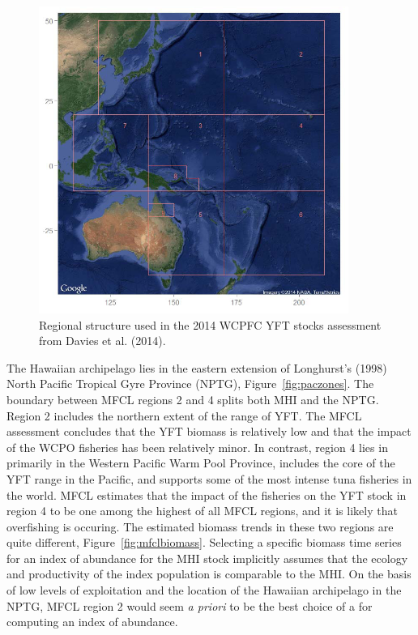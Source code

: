 \documentclass[12pt,letterpaper]{article}
\begin{document}
\begin{figure}
\begin{center}
\includegraphics[width=0.9\textwidth]{./MFCLregions.png}
\caption{\label{fig:mfclregions}
Regional structure used in the 2014 WCPFC YFT stocks assessment from
Davies et al. (2014).
}
\end{center}
\end{figure}

The Hawaiian archipelago lies in the eastern extension of Longhurst's
(1998) North Pacific Tropical Gyre Province (NPTG), 
Figure~\ref{fig:paczones}.
The boundary between MFCL regions 2 and 4 splits both MHI and the NPTG.
Region 2 includes the northern extent of the range of YFT. The MFCL
assessment concludes that the YFT biomass is relatively low and that
the impact of the WCPO fisheries has been relatively minor.
In contrast, region 4 lies in primarily in the Western Pacific Warm
Pool Province, includes the core of the YFT range in the Pacific,
and supports some of the most intense tuna fisheries in the world.
MFCL estimates that the impact of the fisheries on the YFT stock in
region 4 to be one among the highest of all MFCL regions, and it is
likely that overfishing is occuring.
The estimated biomass trends in these two regions are quite different,
Figure~\ref{fig:mfclbiomass}.
Selecting a specific biomass time series for an
index of abundance for the MHI stock implicitly assumes
that the ecology and productivity of the index population 
is comparable to the MHI.
On the basis of low levels of exploitation and the location of the
Hawaiian archipelago in the NPTG, MFCL region 2 would seem {\it a
priori} to be the best choice of a for computing an index of
abundance.
\end{document}
